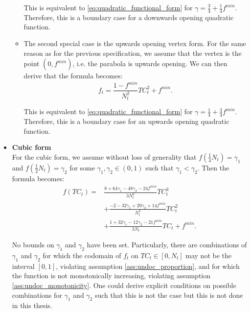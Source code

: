 \documentclass[12pt]{article}
\begin{document}
\begin{itemize}
\begin{itemize}
		        This is equivalent to \eqref{eq:quadratic_functional_form} for $\gamma = \frac{3}{4} + \frac{1}{4} f^{min}$. Therefore, this is a boundary case for a downwards opening quadratic function.
		        
		        \item The second special case is the upwards opening vertex form. For the same reason as for the previous specification, we assume that the vertex is the point $(0, f^{min})$, i.e. the parabola is upwards opening. We can then derive that the formula becomes:
		            \begin{equation} \label{eq:quadratic_upwards_functional_form}
		                f_t = \frac{1-f^{min}}{N_t^2}TC_t^2 + f^{min}.
		            \end{equation}
		            
		        This is equivalent to \eqref{eq:quadratic_functional_form} for $\gamma = \frac{1}{4} + \frac{3}{4}f^{min}$. Therefore, this is a boundary case for an upwards opening quadratic function.
		    \end{itemize}
		    
		\item \textbf{Cubic form}\\
		For the cubic form, we assume without loss of generality that $f\left(\frac{1}{4}N_t\right) = \gamma_1$ and $f\left(\frac{1}{2}N_t\right) = \gamma_2$ for some $\gamma_1, \gamma_2 \in (0,1)$ such that $\gamma_1 < \gamma_2$. Then the formula becomes:
		    \begin{equation} \label{eq:cubic_functional_form}
		        \begin{split}
            		f(TC_t) = &\frac{8 + 64\gamma_1 - 48\gamma_2 -24f^{min}}{3N_t^3}TC_t^3 \\
            		&+ \frac{-2 - 32\gamma_1 + 20\gamma_2 + 14f^{min}}{N_t^2}TC_t^2 \\
            		&+ \frac{1 + 32\gamma_1 - 12\gamma_2 - 21f^{min}}{3N_t}TC_t + f^{min}.
        		\end{split}
		    \end{equation}
		    
	    No bounds on $\gamma_1$ and $\gamma_2$ have been set. Particularly, there are combinations of $\gamma_1$ and $\gamma_2$ for which the codomain of $f_t$ on $TC_t \in [0,N_t]$ may not be the interval $[0,1]$, violating assumption \ref{ass:undoc_proportion}, and for which the function is not monotonically increasing, violating assumption \ref{ass:undoc_monotonicity}. One could derive explicit conditions on possible combinations for $\gamma_1$ and $\gamma_2$ such that this is not the case but this is not done in this thesis.
	\end{itemize}
	
\end{document}
